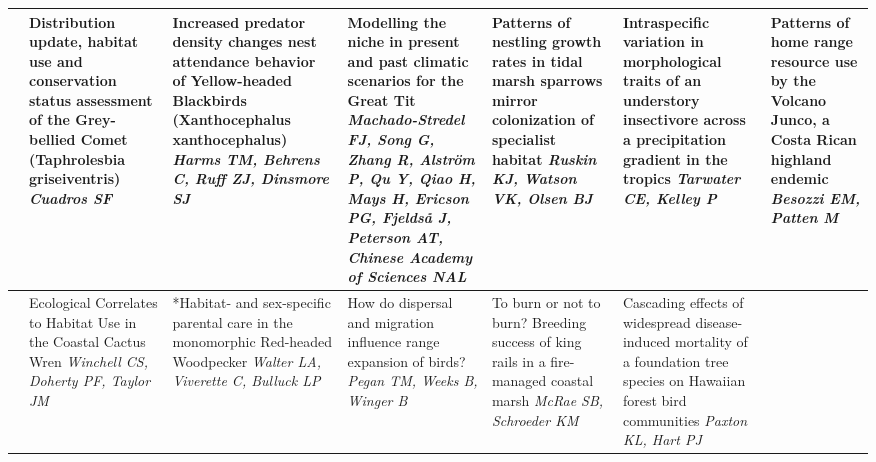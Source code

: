 \begin{tabular}{|x{0.75cm}|x{2.25cm}|x{2.25cm}|x{2.25cm}|x{2.25cm}|x{2.25cm}|x{2.25cm}|}
\hline
{}&Distribution update, habitat use and conservation status assessment of the Grey-bellied Comet (Taphrolesbia griseiventris) \newline \newline \textit{Cuadros SF} & Increased predator density changes nest attendance behavior of Yellow-headed Blackbirds (Xanthocephalus xanthocephalus) \newline \newline \textit{Harms TM, Behrens C, Ruff ZJ, Dinsmore SJ} & Modelling the niche in present and past climatic scenarios for the Great Tit \newline \newline \textit{Machado-Stredel FJ, Song G, Zhang R, Alström P, Qu Y, Qiao H, Mays H, Ericson PG, Fjeldså J, Peterson AT, Chinese Academy of Sciences NAL} & Patterns of nestling growth rates in tidal marsh sparrows mirror colonization of specialist habitat \newline \newline \textit{Ruskin KJ, Watson VK, Olsen BJ} & Intraspecific variation in morphological traits of an understory insectivore across a precipitation gradient in the tropics \newline \newline \textit{Tarwater CE, Kelley P} & Patterns of home range resource use by the Volcano Junco, a Costa Rican highland endemic \newline \newline \textit{Besozzi EM, Patten M}\\
\hline
{}&Ecological Correlates to Habitat Use in the Coastal Cactus Wren \newline \newline \textit{Winchell CS, Doherty PF, Taylor JM} & *Habitat- and sex-specific parental care in the monomorphic Red-headed Woodpecker \newline \newline \textit{Walter LA, Viverette C, Bulluck LP} & How do dispersal and migration influence range expansion of birds? \newline \newline \textit{Pegan TM, Weeks B, Winger B} & To burn or not to burn? Breeding success of king rails in a fire-managed coastal marsh \newline \newline \textit{McRae SB, Schroeder KM} & Cascading effects of widespread disease-induced mortality of a foundation tree species on Hawaiian forest bird communities \newline \newline \textit{Paxton KL, Hart PJ}\\

\end{tabular}
